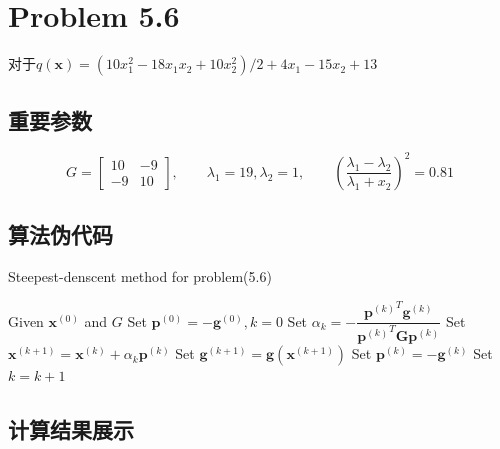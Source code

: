 \newpage
\section{Problem 5.6}
对于$q(\bm{x})=(10x_1^2-18x_1x_2+10x_2^2)/2+4x_1-15x_2+13$

\subsection{重要参数}

\[G=\begin{bmatrix}
10&-9\\
-9&10
\end{bmatrix},\qquad \lambda_1=19,\lambda_2=1,\qquad (\dfrac {\lambda_{1}-\lambda_{2}}{\lambda_{1}+x_{2}})^2 =0.81\]

\subsection{算法伪代码}
\begin{algorithm}[h]  
\caption{Steepest-denscent method for problem(5.6)}  
\begin{algorithmic}[1]  
\STATE Given $\bm{x}^{(0)}$ and $G$
\STATE Set $\bm{p}^{(0)}=-\bm{g}^{(0)},k=0$
\STATE Set $\alpha_k=-\dfrac{{{\bm{p}^{(k)}}^T}\bm{g}^{(k)}}{{\bm{p}^{(k)}}^T\bm{G}\bm{p}^{(k)}}$
\STATE Set $\bm{x}^{(k+1)}=\bm{x}^{(k)}+\alpha_k\bm{p}^{(k)}$
\STATE Set $\bm{g}^{(k+1)}=\bm{g}(\bm{x}^{(k+1)})$
\STATE Set $\bm{p}^{(k)}=-\bm{g}^{(k)}$
\STATE Set $k=k+1$
\ENDWHILE
\end{algorithmic}  
\end{algorithm}  

\subsection{计算结果展示}

